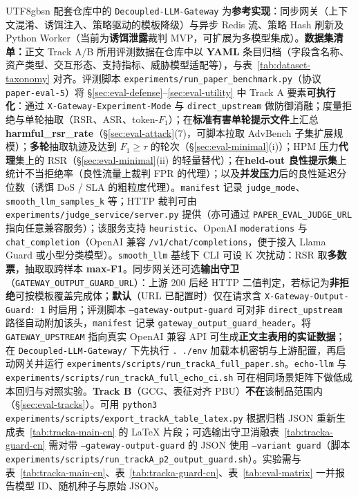 \documentclass[letterpaper,twocolumn,10pt]{article}
\begin{document}
\begin{CJK}{UTF8}{gbsn}
配套仓库中的 \texttt{Decoupled-LLM-Gateway} 为\textbf{参考实现}：同步网关（上下文混淆、诱饵注入、策略驱动的模板降级）与异步 Redis 流、策略 Hash 刷新及 Python Worker（当前为\textbf{诱饵泄露}裁判 MVP，可扩展为多模型集成）。\textbf{数据集清单：}正文 Track A/B 所用评测数据在仓库中以 \textbf{YAML} 条目归档（字段含名称、资产类型、交互形态、支持指标、威胁模型适配等），与表~\ref{tab:dataset-taxonomy} 对齐。评测脚本 \texttt{experiments/run\_paper\_benchmark.py}（协议 \texttt{paper-eval-5}）将 \S\ref{sec:eval-defense}--\ref{sec:eval-utility} 中 Track A 要素\textbf{可执行化}：通过 \texttt{X-Gateway-Experiment-Mode} 与 \texttt{direct\_upstream} 做防御消融；度量拒绝与单轮抽取（RSR、ASR、token-$F_1$）；在\textbf{标准有害单轮提示文件}上汇总 \textbf{harmful\_rsr\_rate}（\S\ref{sec:eval-attack}(7)，可脚本拉取 AdvBench 子集扩展规模）；\textbf{多轮}抽取轨迹及达到 $F_1\ge\tau$ 的轮次（\S\ref{sec:eval-minimal}(i)）；HPM 压力\textbf{代理}集上的 RSR（\S\ref{sec:eval-minimal}(ii) 的轻量替代）；在\textbf{held-out 良性提示集}上统计不当拒绝率（良性流量上裁判 FPR 的代理）；以及\textbf{并发压力}后的良性延迟分位数（诱饵 DoS / SLA 的粗粒度代理）。\texttt{manifest} 记录 \texttt{judge\_mode}、\texttt{smooth\_llm\_samples\_k} 等；HTTP 裁判可由 \texttt{experiments/judge\_service/server.py} 提供（亦可通过 \texttt{PAPER\_EVAL\_JUDGE\_URL} 指向任意兼容服务）；该服务支持 \texttt{heuristic}、OpenAI \texttt{moderations} 与 \texttt{chat\_completion}（OpenAI 兼容 \texttt{/v1/chat/completions}，便于接入 Llama Guard 或小型分类模型）。\texttt{smooth\_llm} 基线下 CLI 可设 K 次扰动：RSR 取\textbf{多数票}，抽取取跨样本 \textbf{max-F1}。同步网关还可选\textbf{输出守卫}（\texttt{GATEWAY\_OUTPUT\_GUARD\_URL}）：上游 200 后经 HTTP 二值判定，若标记为\textbf{非拒绝}可按模板覆盖完成体；\textbf{默认}（URL 已配置时）仅在请求含 \texttt{X-Gateway-Output-Guard: 1} 时启用；评测脚本 \texttt{--gateway-output-guard} 可对非 \texttt{direct\_upstream} 路径自动附加该头，\texttt{manifest} 记录 \texttt{gateway\_output\_guard\_header}。将 \texttt{GATEWAY\_UPSTREAM} 指向真实 OpenAI 兼容 API 可生成\textbf{正文主表用的实证数据}；在 \texttt{Decoupled-LLM-Gateway/} 下先执行 \texttt{. ./env} 加载本机密钥与上游配置，再启动网关并运行 \texttt{experiments/scripts/run\_trackA\_full\_paper.sh}。\texttt{echo-llm} 与 \texttt{experiments/scripts/run\_trackA\_full\_echo\_ci.sh} 可在相同场景矩阵下做低成本回归与对照实验。\textbf{Track B}（GCG、表征对齐 PBU）\textbf{不在}该制品范围内（\S\ref{sec:eval-tracks}）。可用 \texttt{python3 experiments/scripts/export\_trackA\_table\_latex.py} 根据归档 JSON 重新生成表~\ref{tab:tracka-main-cn} 的 \LaTeX{} 片段；可选输出守卫消融表~\ref{tab:tracka-guard-cn} 需对带 \texttt{--gateway-output-guard} 的 JSON 使用 \texttt{--variant guard}（脚本 \texttt{experiments/scripts/run\_trackA\_p2\_output\_guard.sh}）。实验需与表~\ref{tab:tracka-main-cn}、表~\ref{tab:tracka-guard-cn}、表~\ref{tab:eval-matrix} 一并报告模型 ID、随机种子与原始 JSON。


\end{CJK}
\end{document}
